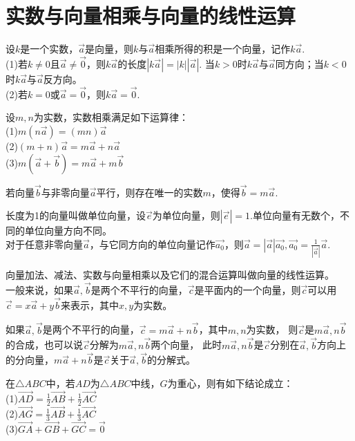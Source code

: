 \section{实数与向量相乘与向量的线性运算}
\begin{theorem}
    设$k$是一个实数，$\vec{a}$是向量，则$k$与$\vec{a}$相乘所得的积是一个向量，记作$k\vec{a}$. \\
    (1)若$k \ne 0$且$\vec{a}\ne \vec{0}$，则$k\vec{a}$的长度$|k\vec{a}|=|k||\vec{a}|$.
    当$k>0$时$k\vec{a}$与$\vec{a}$同方向；当$k<0$时$k\vec{a}$与$\vec{a}$反方向。 \\
    (2)若$k = 0$或$\vec{a}=\vec{0}$，则$k\vec{a}=\vec{0}$.
\end{theorem}
\begin{theorem}
    设$m,n$为实数，实数相乘满足如下运算律：\\
    (1)$m(n\vec{a})=(mn)\vec{a}$ \\
    (2)$(m+n)\vec{a}=m\vec{a}+n\vec{a}$ \\
    (3)$m(\vec{a}+\vec{b})=m\vec{a}+m\vec{b}$
\end{theorem}
\begin{theorem}
    若向量$\vec{b}$与非零向量$\vec{a}$平行，则存在唯一的实数$m$，使得$\vec{b}=m\vec{a}$.
\end{theorem}
\begin{theorem}
    长度为1的向量叫做单位向量，设$\vec{e}$为单位向量，则$|\vec{e}|=1$.单位向量有无数个，不同的单位向量方向不同。\\
    对于任意非零向量$\vec{a}$，与它同方向的单位向量记作$\vec{a_0}$，则$\vec{a}=|\vec{a}|\vec{a_0},\vec{a_0}=\frac{1}{|\vec{a}|}\vec{a}$.
\end{theorem}
\begin{theorem}
    向量加法、减法、实数与向量相乘以及它们的混合运算叫做向量的线性运算。\\
    一般来说，如果$\vec{a},\vec{b}$是两个不平行的向量，$\vec{c}$是平面内的一个向量，则$\vec{c}$可以用$\vec{c}=x\vec{a}+y\vec{b}$来表示，其中$x,y$为实数。
\end{theorem}
\begin{theorem}
    如果$\vec{a},\vec{b}$是两个不平行的向量，$\vec{c}=m\vec{a}+n\vec{b}$，其中$m,n$为实数，
    则$\vec{c}$是$m\vec{a},n\vec{b}$的合成，也可以说$\vec{c}$分解为$m\vec{a},n\vec{b}$两个向量，
    此时$m\vec{a},n\vec{b}$是$\vec{c}$分别在$\vec{a},\vec{b}$方向上的分向量，$m\vec{a}+n\vec{b}$是$\vec{c}$关于$\vec{a},\vec{b}$的分解式。
\end{theorem}
\begin{theorem}
    在$\triangle ABC$中，若$AD$为$\triangle ABC$中线，$G$为重心，则有如下结论成立：\\
    (1)$\overrightarrow{AD}=\frac{1}{2}\overrightarrow{AB}+\frac{1}{2}\overrightarrow{AC}$ \\
    (2)$\overrightarrow{AG}=\frac{1}{3}\overrightarrow{AB}+\frac{1}{3}\overrightarrow{AC}$ \\
    (3)$\overrightarrow{GA}+\overrightarrow{GB}+\overrightarrow{GC}=\vec{0}$
\end{theorem}
\clearpage
